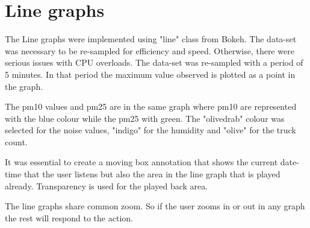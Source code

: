 \documentclass[11pt]{article}
\begin{document}
\section{Line graphs}
\label{sec:orgbeff4fe}
The Line graphs were implemented using "line" class from Bokeh.  The data-set was necessary to be re-sampled for efficiency and speed.  Otherwise, there were serious issues with CPU overloads.  The data-set was re-sampled with a period of 5 minutes.  In that period the maximum value observed is plotted as a point in the graph.

The pm10 values and pm25 are in the same graph where pm10 are represented with the blue colour while the pm25 with green.  The "olivedrab" colour was selected for the noise values, "indigo" for the humidity and "olive" for the truck count.

It was essential to create a moving box annotation that shows the current date-time that the user listens but also the area in the line graph that is played already.   Transparency is used for the played back area.

The line graphs share common zoom.  So if the user zooms in or out in any graph the rest will respond to the action.
\end{document}
